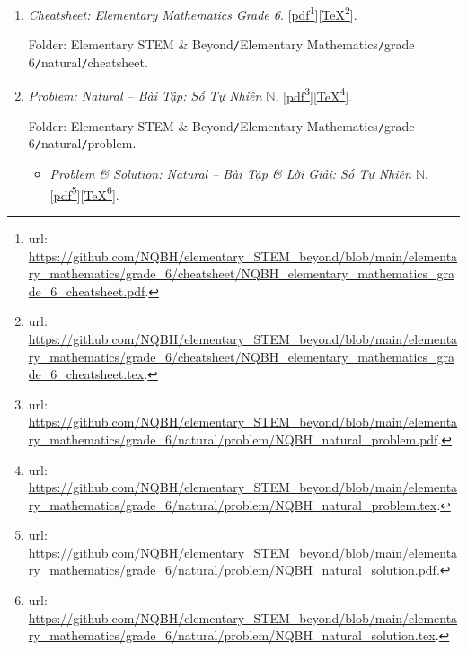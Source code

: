 \documentclass[12pt,oneside]{book}
\begin{document}
\begin{enumerate}
	\item {\it Cheatsheet: Elementary Mathematics Grade 6}. [\href{https://github.com/NQBH/elementary_STEM_beyond/blob/main/elementary_mathematics/grade_6/cheatsheet/NQBH_elementary_mathematics_grade_6_cheatsheet.pdf}{pdf}\footnote{{\sc url}: \url{https://github.com/NQBH/elementary_STEM_beyond/blob/main/elementary_mathematics/grade_6/cheatsheet/NQBH_elementary_mathematics_grade_6_cheatsheet.pdf}.}][\href{https://github.com/NQBH/elementary_STEM_beyond/blob/main/elementary_mathematics/grade_6/cheatsheet/NQBH_elementary_mathematics_grade_6_cheatsheet.tex}{\TeX}\footnote{{\sc url}: \url{https://github.com/NQBH/elementary_STEM_beyond/blob/main/elementary_mathematics/grade_6/cheatsheet/NQBH_elementary_mathematics_grade_6_cheatsheet.tex}.}].
	
	Folder: {\sf Elementary STEM \& Beyond{\tt/}Elementary Mathematics{\tt/}grade 6{\tt/}natural{\tt/}cheatsheet}.
	\item {\it Problem: Natural -- Bài Tập: Số Tự Nhiên $\mathbb{N}$}. [\href{https://github.com/NQBH/elementary_STEM_beyond/blob/main/elementary_mathematics/grade_6/natural/problem/NQBH_natural_problem.pdf}{pdf}\footnote{{\sc url}: \url{https://github.com/NQBH/elementary_STEM_beyond/blob/main/elementary_mathematics/grade_6/natural/problem/NQBH_natural_problem.pdf}.}][\href{https://github.com/NQBH/elementary_STEM_beyond/blob/main/elementary_mathematics/grade_6/natural/problem/NQBH_natural_problem.tex}{\TeX}\footnote{{\sc url}: \url{https://github.com/NQBH/elementary_STEM_beyond/blob/main/elementary_mathematics/grade_6/natural/problem/NQBH_natural_problem.tex}.}].
	
	Folder: {\sf Elementary STEM \& Beyond{\tt/}Elementary Mathematics{\tt/}grade 6{\tt/}natural{\tt/}problem}.
	\begin{itemize}
		\item {\it Problem \& Solution: Natural -- Bài Tập \& Lời Giải: Số Tự Nhiên $\mathbb{N}$}. [\href{https://github.com/NQBH/elementary_STEM_beyond/blob/main/elementary_mathematics/grade_6/natural/problem/NQBH_natural_solution}{pdf}\footnote{{\sc url}: \url{https://github.com/NQBH/elementary_STEM_beyond/blob/main/elementary_mathematics/grade_6/natural/problem/NQBH_natural_solution.pdf}.}][\href{https://github.com/NQBH/elementary_STEM_beyond/blob/main/elementary_mathematics/grade_6/natural/problem/NQBH_natural_solution.tex}{\TeX}\footnote{{\sc url}: \url{https://github.com/NQBH/elementary_STEM_beyond/blob/main/elementary_mathematics/grade_6/natural/problem/NQBH_natural_solution.tex}.}].
		

\end{itemize}
\end{enumerate}
\end{document}
